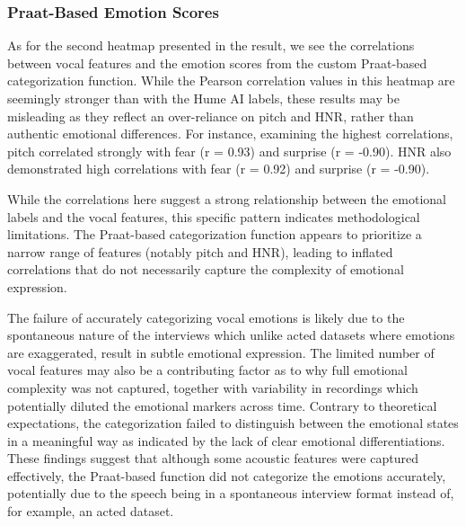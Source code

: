 \subsubsection{Praat-Based Emotion Scores}
As for the second heatmap presented in the result, we see the correlations between vocal features and the emotion scores from the custom Praat-based categorization function. While the Pearson correlation values in this heatmap are seemingly stronger than with the Hume AI labels, these results may be misleading as they reflect an over-reliance on pitch and HNR, rather than authentic emotional differences.
For instance, examining the highest correlations, pitch correlated strongly with fear (r = 0.93) and surprise (r = -0.90). HNR also demonstrated high correlations with fear (r = 0.92) and surprise (r = -0.90). 

While the correlations here suggest a strong relationship between the emotional labels and the vocal features, this specific pattern indicates methodological limitations. The Praat-based categorization function appears to prioritize a narrow range of features (notably pitch and HNR), leading to inflated correlations that do not necessarily capture the complexity of emotional expression.

The failure of accurately categorizing vocal emotions is likely due to the spontaneous nature of the interviews which unlike acted datasets where emotions are exaggerated, result in subtle emotional expression. The limited number of vocal features may also be a contributing factor as to why full emotional complexity was not captured, together with variability in recordings which potentially diluted the emotional markers across time.
Contrary to theoretical expectations, the categorization failed to distinguish between the emotional states in a meaningful way as indicated by the lack of clear emotional differentiations. These findings suggest that although some acoustic features were captured effectively, the Praat-based function did not categorize the emotions accurately, potentially due to the speech being in a spontaneous interview format instead of, for example, an acted dataset. 

